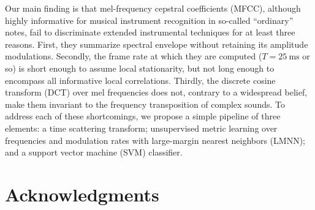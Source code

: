 \documentclass{article}
\begin{document}
Our main finding is that mel-frequency cepstral coefficients (MFCC), although highly informative for musical instrument recognition in so-called ``ordinary'' notes, fail to discriminate extended instrumental techniques for at least three reasons.
First, they summarize spectral envelope without retaining its amplitude modulations.
Secondly, the frame rate at which they are computed ($T=\SI{25}{\milli\second}$ or so) is short enough to assume local stationarity, but not long enough to encompass all informative local correlations.
Thirdly, the discrete cosine transform (DCT) over mel frequencies does not, contrary to a widespread belief, make them invariant to the frequency transposition of complex sounds.
To address each of these shortcomings, we propose a simple pipeline of three elements: a time scattering transform; unsupervised metric learning over frequencies and modulation rates with large-margin nearest neighbors (LMNN); and a support vector machine (SVM) classifier.


\section{Acknowledgments}




\end{document}
